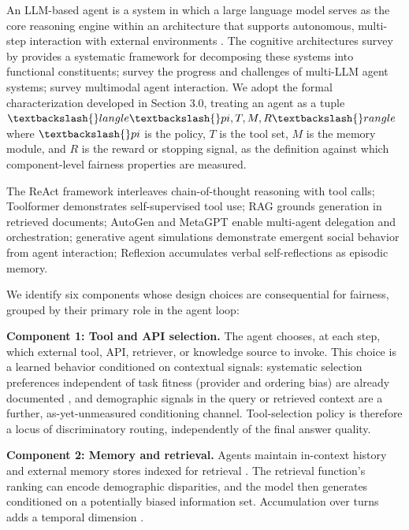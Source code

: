 \documentclass[10pt]{article}
\begin{document}
An LLM-based agent is a system in which a large language model serves as the core reasoning engine within an architecture that supports autonomous, multi-step interaction with external environments \cite{wang2024survey,xi2023rise}. The cognitive architectures survey by \cite{sumers2024cognitive} provides a systematic framework for decomposing these systems into functional constituents; \cite{guo2024large} survey the progress and challenges of multi-LLM agent systems; \cite{durante2024agent} survey multimodal agent interaction. We adopt the formal characterization developed in Section 3.0, treating an agent as a tuple $\textbackslash\{\}langle \textbackslash\{\}pi, T, M, R \textbackslash\{\}rangle$ where $\textbackslash\{\}pi$ is the policy, $T$ is the tool set, $M$ is the memory module, and $R$ is the reward or stopping signal, as the definition against which component-level fairness properties are measured.

The ReAct framework \cite{yao2023react} interleaves chain-of-thought reasoning with tool calls; Toolformer \cite{schick2023toolformer} demonstrates self-supervised tool use; RAG \cite{lewis2020retrieval} grounds generation in retrieved documents; AutoGen \cite{wu2023autogen} and MetaGPT \cite{hong2024metagpt} enable multi-agent delegation and orchestration; generative agent simulations \cite{park2023generative} demonstrate emergent social behavior from agent interaction; Reflexion \cite{shinn2023reflexion} accumulates verbal self-reflections as episodic memory.

We identify six components whose design choices are consequential for fairness, grouped by their primary role in the agent loop:

\textbf{Component 1: Tool and API selection.} The agent chooses, at each step, which external tool, API, retriever, or knowledge source to invoke. This choice is a learned behavior conditioned on contextual signals: systematic selection preferences independent of task fitness (provider and ordering bias) are already documented \cite{blankenstein2025biasbusters}, and demographic signals in the query or retrieved context are a further, as-yet-unmeasured conditioning channel. Tool-selection policy is therefore a locus of discriminatory routing, independently of the final answer quality.

\textbf{Component 2: Memory and retrieval.} Agents maintain in-context history and external memory stores indexed for retrieval \cite{lewis2020retrieval}. The retrieval function's ranking can encode demographic disparities, and the model then generates conditioned on a potentially biased information set. Accumulation over turns adds a temporal dimension \cite{fan2024fairmt}.
\end{document}
